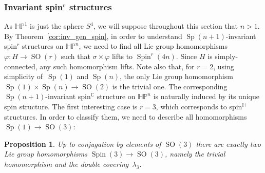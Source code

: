 \documentclass[pdftex]{sigma}
\numberwithin{equation}{section}
\newtheorem{Proposition}[Theorem]{Proposition}
{ \theoremstyle{definition}
	\newtheorem{Definition}[Theorem]{Definition}
	\newtheorem{Note}[Theorem]{Note}
	\newtheorem{Example}[Theorem]{Example}
	\newtheorem{Remark}[Theorem]{Remark} }
\DeclareMathOperator{\SO}{SO}
\DeclareMathOperator{\Spin}{Spin}
\DeclareMathOperator{\Sp}{Sp}
\begin{document}
		\subsubsection[Invariant spin\^{}r structures]{Invariant spin$^{\boldsymbol{r}}$ structures}\label{section:hpn_structures}
		
		As $\mathbb{HP}^1$ is just the sphere $S^4$, we will suppose throughout this section that $n > 1$. By Theorem~\ref{cor:inv_gen_spin}, in order to understand $\Sp(n+1)$-invariant spin$^r$ structures on $\mathbb{HP}^n$, we need to find all Lie group homomorphisms $ \varphi \colon H \to \SO(r)$ such that $\sigma \times \varphi$ lifts to $\Spin^r(4n)$. Since $H$ is simply-connected, any such homomorphism lifts. Note also that, for $r=2$, using simplicity of~$\Sp(1)$ and $\Sp(n)$, the only Lie group homomorphism $\Sp(1) \times \Sp(n) \to \SO(2)$ is the trivial one. The corresponding $\Sp(n+1)$-invariant spin$^{\mathbb{C}}$ structure on $\mathbb{HP}^n$ is naturally induced by its unique spin structure. The first interesting case is $r=3$, which corresponds to spin$^{\mathbb{H}}$ structures. In order to classify them, we need to describe all homomorphisms $\Sp(1) \to \SO(3)$:
		
		\begin{Proposition} \label{prop:reps2}
			Up to conjugation by elements of $\SO(3)$ there are exactly two Lie group homomorphisms $\Spin(3) \to \SO(3)$, namely the trivial homomorphism and the double covering~$\lambda_3$.
		\end{Proposition}
		
\end{document}
